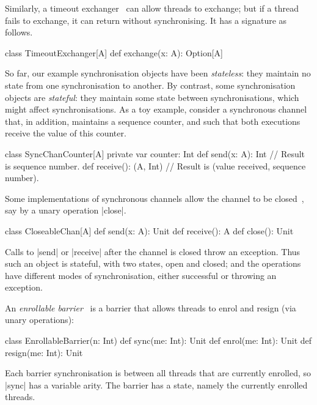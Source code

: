 Similarly, a timeout exchanger~\cite{HSY2004,herlihy-shavit} can allow threads
to exchange; but if a thread fails to exchange, it can return without
synchronising.  It has a signature as follows.
\begin{scala}
class TimeoutExchanger[A]{
  def exchange(x: A): Option[A]
}
\end{scala}


So far, our example synchronisation objects have been \emph{stateless}: they
maintain no state from one synchronisation to another.  By contrast, some
synchronisation objects are \emph{stateful}: they maintain some state between
synchronisations, which might affect synchronisations.  As a toy example,
consider a synchronous channel that, in addition, maintains a sequence
counter, and such that both executions receive the value of this counter.
\begin{scala}
class SyncChanCounter[A]{
  private var counter: Int
  def send(x: A): Int      // Result is sequence number.
  def receive(): (A, Int)  // Result is (value received, sequence number).
}
\end{scala}


Some implementations of synchronous channels allow the channel to be
closed~\cite{JCSP,sufrin:CSO}, say by a unary operation |close|.
\begin{scala}
class CloseableChan[A]{
  def send(x: A): Unit
  def receive(): A
  def close(): Unit
}
\end{scala} 
%
Calls to |send| or |receive| after the channel is closed throw an exception.
Thus such an object is stateful, with two states, open and closed; and the
operations have different modes of synchronisation, either successful or
throwing an exception.

An \emph{enrollable barrier}~\cite{alting-barrier} is a barrier
that allows threads to enrol and resign (via unary operations):
%
\begin{scala}
class EnrollableBarrier(n: Int){
  def sync(me: Int): Unit
  def enrol(me: Int): Unit
  def resign(me: Int): Unit
}
\end{scala} 
%
Each barrier synchronisation is between all threads that are currently
enrolled, so |sync| has a variable arity.  The barrier has a state, namely the
currently enrolled threads.

